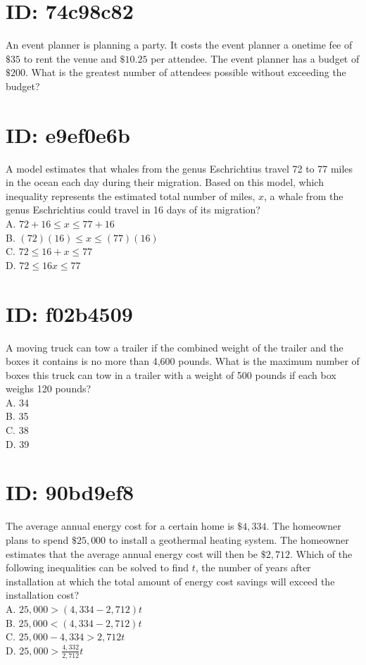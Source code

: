 \section*{ID: 74c98c82}
An event planner is planning a party. It costs the event planner a onetime fee of $\$ 35$ to rent the venue and $\$ 10.25$ per attendee. The event planner has a budget of $\$ 200$. What is the greatest number of attendees possible without exceeding the budget?

\section*{ID: e9ef0e6b}
A model estimates that whales from the genus Eschrichtius travel 72 to 77 miles in the ocean each day during their migration. Based on this model, which inequality represents the estimated total number of miles, $x$, a whale from the genus Eschrichtius could travel in 16 days of its migration?\\
A. $72+16 \leq x \leq 77+16$\\
B. $(72)(16) \leq x \leq(77)(16)$\\
C. $72 \leq 16+x \leq 77$\\
D. $72 \leq 16 x \leq 77$

\section*{ID: f02b4509}
A moving truck can tow a trailer if the combined weight of the trailer and the boxes it contains is no more than 4,600 pounds. What is the maximum number of boxes this truck can tow in a trailer with a weight of 500 pounds if each box weighs 120 pounds?\\
A. 34\\
B. 35\\
C. 38\\
D. 39

\section*{ID: 90bd9ef8}
The average annual energy cost for a certain home is $\$ 4,334$. The homeowner plans to spend $\$ 25,000$ to install a geothermal heating system. The homeowner estimates that the average annual energy cost will then be $\$ 2,712$. Which of the following inequalities can be solved to find $t$, the number of years after installation at which the total amount of energy cost savings will exceed the installation cost?\\
A. $25,000>(4,334-2,712) t$\\
B. $25,000<(4,334-2,712) t$\\
C. $25,000-4,334>2,712 t$\\
D. $25,000>\frac{4,332}{2,712} t$

